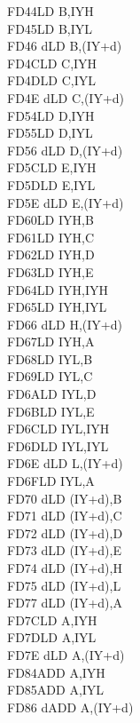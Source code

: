 \begin{multicols}{3}
{\begin{tabbing}
	FD44\>LD B,IYH\UNDOC\\
	FD45\>LD B,IYL\UNDOC\\
	FD46 d\>LD B,(IY+d)\\
	FD4C\>LD C,IYH\UNDOC\\
	FD4D\>LD C,IYL\UNDOC\\
	FD4E d\>LD C,(IY+d)\\
	FD54\>LD D,IYH\UNDOC\\
	FD55\>LD D,IYL\UNDOC\\
	FD56 d\>LD D,(IY+d)\\
	FD5C\>LD E,IYH\UNDOC\\
	FD5D\>LD E,IYL\UNDOC\\
	FD5E d\>LD E,(IY+d)\\
	FD60\>LD IYH,B\UNDOC\\
	FD61\>LD IYH,C\UNDOC\\
	FD62\>LD IYH,D\UNDOC\\
	FD63\>LD IYH,E\UNDOC\\
	FD64\>LD IYH,IYH\UNDOC\\
	FD65\>LD IYH,IYL\UNDOC\\
	FD66 d\>LD H,(IY+d)\\
	FD67\>LD IYH,A\UNDOC\\
	FD68\>LD IYL,B\UNDOC\\
	FD69\>LD IYL,C\UNDOC\\
	FD6A\>LD IYL,D\UNDOC\\
	FD6B\>LD IYL,E\UNDOC\\
	FD6C\>LD IYL,IYH\UNDOC\\
	FD6D\>LD IYL,IYL\UNDOC\\
	FD6E d\>LD L,(IY+d)\\
	FD6F\>LD IYL,A\UNDOC\\
	FD70 d\>LD (IY+d),B\\
	FD71 d\>LD (IY+d),C\\
	FD72 d\>LD (IY+d),D\\
	FD73 d\>LD (IY+d),E\\
	FD74 d\>LD (IY+d),H\\
	FD75 d\>LD (IY+d),L\\
	FD77 d\>LD (IY+d),A\\
	FD7C\>LD A,IYH\UNDOC\\
	FD7D\>LD A,IYL\UNDOC\\
	FD7E d\>LD A,(IY+d)\\
	FD84\>ADD A,IYH\UNDOC\\
	FD85\>ADD A,IYL\UNDOC\\
	FD86 d\>ADD A,(IY+d)\\

\end{tabbing}}
\end{multicols}
